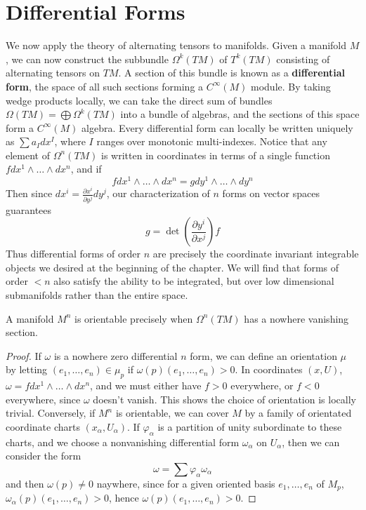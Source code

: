 \section{Differential Forms}

We now apply the theory of alternating tensors to manifolds. Given a manifold $M$, we can now construct the subbundle $\Omega^k(TM)$ of $T^k(TM)$ consisting of alternating tensors on $TM$. A section of this bundle is known as a {\bf differential form}, the space of all such sections forming a $C^\infty(M)$ module. By taking wedge products locally, we can take the direct sum of bundles $\Omega(TM) = \bigoplus \Omega^k(TM)$ into a bundle of algebras, and the sections of this space form a $C^\infty(M)$ algebra. Every differential form can locally be written uniquely as $\sum a_I dx^I$, where $I$ ranges over monotonic multi-indexes. Notice that any element of $\Omega^n(TM)$ is written in coordinates in terms of a single function $f dx^1 \wedge \dots \wedge dx^n$, and if
%
\[ f dx^1 \wedge \dots \wedge dx^n = g dy^1 \wedge \dots \wedge dy^n \]
%
Then since $dx^i = \frac{\partial x^i}{\partial y^j} dy^j$, our characterization of $n$ forms on vector spaces guarantees
%
\[ g = \det \left( \frac{\partial y^i}{\partial x^j} \right) f \]
%
Thus differential forms of order $n$ are precisely the coordinate invariant integrable objects we desired at the beginning of the chapter. We will find that forms of order $< n$ also satisfy the ability to be integrated, but over low dimensional submanifolds rather than the entire space.

\begin{theorem}
    A manifold $M^n$ is orientable precisely when $\Omega^n(TM)$ has a nowhere vanishing section.
\end{theorem}
\begin{proof}
    If $\omega$ is a nowhere zero differential $n$ form, we can define an orientation $\mu$ by letting $(e_1, \dots, e_n) \in \mu_p$ if $\omega(p)(e_1, \dots, e_n) > 0$. In coordinates $(x,U)$, $\omega = f dx^1 \wedge \dots \wedge dx^n$, and we must either have $f > 0$ everywhere, or $f < 0$ everywhere, since $\omega$ doesn't vanish. This shows the choice of orientation is locally trivial. Conversely, if $M^n$ is orientable, we can cover $M$ by a family of orientated coordinate charts $(x_\alpha, U_\alpha)$. If $\varphi_\alpha$ is a partition of unity subordinate to these charts, and we choose a nonvanishing differential form $\omega_\alpha$ on $U_\alpha$, then we can consider the form
    \[ \omega = \sum \varphi_\alpha \omega_\alpha \]
    and then $\omega(p) \neq 0$ naywhere, since for a given oriented basis $e_1, \dots, e_n$ of $M_p$, $\omega_\alpha(p)(e_1, \dots, e_n) > 0$, hence $\omega(p)(e_1, \dots, e_n) > 0$.
\end{proof}

